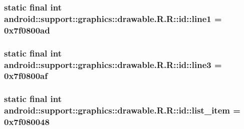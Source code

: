 \hypertarget{classandroid_1_1support_1_1graphics_1_1drawable_1_1_r_1_1id_7e88b934e9c65e227ccb9412623a8140}{
\subsubsection[{line1}]{\setlength{\rightskip}{0pt plus 5cm}static final int android::support::graphics::drawable.R.R::id::line1 = 0x7f0800ad}}
\label{classandroid_1_1support_1_1graphics_1_1drawable_1_1_r_1_1id_7e88b934e9c65e227ccb9412623a8140}


\hypertarget{classandroid_1_1support_1_1graphics_1_1drawable_1_1_r_1_1id_43c24496aa1d43d241d785b5afd19471}{
\subsubsection[{line3}]{\setlength{\rightskip}{0pt plus 5cm}static final int android::support::graphics::drawable.R.R::id::line3 = 0x7f0800af}}
\label{classandroid_1_1support_1_1graphics_1_1drawable_1_1_r_1_1id_43c24496aa1d43d241d785b5afd19471}


\hypertarget{classandroid_1_1support_1_1graphics_1_1drawable_1_1_r_1_1id_adcc9f800f532201631eed599d5ce7aa}{
\subsubsection[{list\_\-item}]{\setlength{\rightskip}{0pt plus 5cm}static final int android::support::graphics::drawable.R.R::id::list\_\-item = 0x7f080048}}
\label{classandroid_1_1support_1_1graphics_1_1drawable_1_1_r_1_1id_adcc9f800f532201631eed599d5ce7aa}



